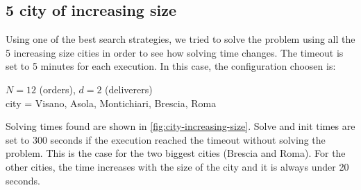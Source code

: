 \documentclass[10pt]{article}
\begin{document}
	\subsection{5 city of increasing size}
	\label{subsec:test-5-cities}
	Using one of the best search strategies, we tried to solve the problem using all the 5 increasing 
	size cities in order to see how solving time changes. The timeout is set to 5 minutes for each execution.
	In this case, the configuration choosen is:
	\begin{center}
		$N = 12$ (orders), $d = 2$ (deliverers)	\\
		city = Visano, Asola, Montichiari, Brescia, Roma
	\end{center}
	Solving times found are shown in \cref{fig:city-increasing-size}. Solve and init times are 
	set to 300 seconds if the execution reached the timeout without solving the problem. This is the
	case for the two biggest cities (Brescia and Roma). For the other cities, the time increases
	with the size of the city and it is always under 20 seconds. 
\end{document}
